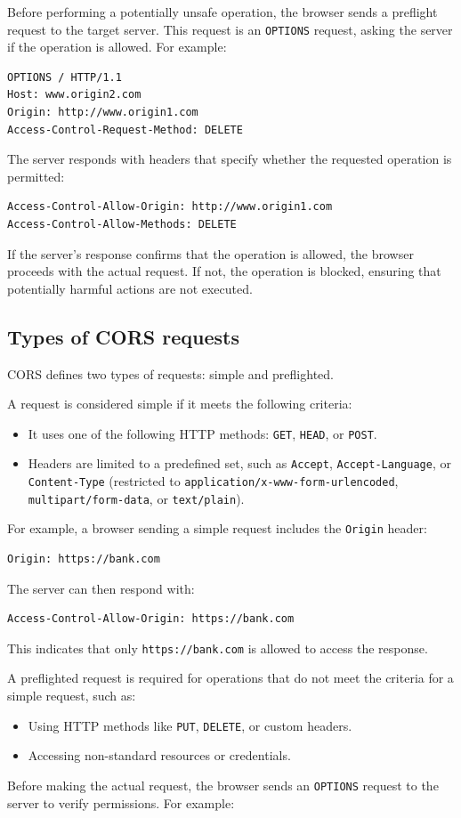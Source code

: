 Before performing a potentially unsafe operation, the browser sends a preflight request to the target server. This request is an \texttt{OPTIONS} request, asking the server if the operation is allowed. For example:
\begin{verbatim}
OPTIONS / HTTP/1.1
Host: www.origin2.com
Origin: http://www.origin1.com
Access-Control-Request-Method: DELETE    
\end{verbatim}
The server responds with headers that specify whether the requested operation is permitted:
\begin{verbatim}
Access-Control-Allow-Origin: http://www.origin1.com
Access-Control-Allow-Methods: DELETE    
\end{verbatim}
If the server's response confirms that the operation is allowed, the browser proceeds with the actual request. If not, the operation is blocked, ensuring that potentially harmful actions are not executed.

\subsection*{Types of CORS requests}
CORS defines two types of requests: simple and preflighted.

A request is considered simple if it meets the following criteria:
\begin{itemize}
    \item It uses one of the following HTTP methods: \texttt{GET}, \texttt{HEAD}, or \texttt{POST}.
    \item Headers are limited to a predefined set, such as \texttt{Accept}, \texttt{Accept-Language}, or \texttt{Content-Type} (restricted to \texttt{application/x-www-form-urlencoded}, \texttt{multipart/form-data}, or \texttt{text/plain}).
\end{itemize}
For example, a browser sending a simple request includes the \texttt{Origin} header:
\begin{verbatim}
Origin: https://bank.com    
\end{verbatim}
The server can then respond with:
\begin{verbatim}
Access-Control-Allow-Origin: https://bank.com
\end{verbatim}
This indicates that only \texttt{https://bank.com} is allowed to access the response.

A preflighted request is required for operations that do not meet the criteria for a simple request, such as:
\begin{itemize}
    \item Using HTTP methods like \texttt{PUT}, \texttt{DELETE}, or custom headers.
    \item Accessing non-standard resources or credentials.
\end{itemize}
Before making the actual request, the browser sends an \texttt{OPTIONS} request to the server to verify permissions. For example:

